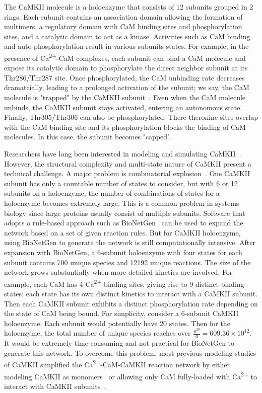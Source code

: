 \documentclass[10pt,letterpaper]{article}
\begin{document}
The CaMKII molecule is a holoenzyme that consists of 12 subunits grouped in 2 rings. Each subunit contains an association domain allowing the formation of multimers, a regulatory domain with CaM binding sites and phosphorylation sites, and a catalytic domain to act as a kinase. Activities such as CaM binding and auto-phosphorylation result in various subunits states. For example, in the presence of Ca\textsuperscript{2+}-CaM complexes, each subunit can bind a CaM molecule and expose its catalytic domain to phosphorylate the direct neighbor subunit at its Thr286/Thr287 site. Once phosphorylated, the CaM unbinding rate decreases dramatcially, leading to a prolonged activation of the subunit; we say, the CaM molecule is "trapped" by the CaMKII subunit~\cite{Meyer:1992dp}. Even when the CaM molecule unbinds, the CaMKII subunit stays activated, entering an autonomous state. Finally, Thr305/Thr306 can also be phosphorylated. There theronine sites overlap with the CaM binding site and its phosphorylation blocks the binding of CaM molecules. In this case, the subunit becomes "capped". 

Researchers have long been interested in modeling and simulating CaMKII~\cite{Zhabotinsky:2000fp,Holmes:2000uk,Kubota:2001ul,Dupont:2003vq,Bhalla:2004cu,Lucic:2008gt,Zeng:2010bq,Pepke:2010ju,Michalski:2012ds}. However, the structural complexity and multi-state nature of CaMKII present a technical challenge. A major problem is combinatorial explosion~\cite{Stefan:2014gl}. One CaMKII subunit has only a countable number of states to consider, but with 6 or 12 subunits on a holoenzyme, the number of combinations of states for a holoenzyme becomes extremely large. This is a common problem in systems biology since large proteins usually consist of multiple subunits. Software that adopts a rule-based approach such as BioNetGen~\cite{Hlavacek:2006iq} can be used to expand the network based on a set of given reaction rules. But for CaMKII holoenzyme, using BioNetGen to generate the network is still computationally intensive. After expansion with BioNetGen, a 6-subunit holoenzyme with four states for each subunit contains 700 unique species and 12192 unique reactions. The size of the network grows substantially when more detailed kinetics are involved. For example, each CaM has 4 Ca\textsuperscript{2+}-binding sites, giving rise to 9 distinct binding states; each state has its own distinct kinetics to interact with a CaMKII subunit. Then each CaMKII subunit exhibits a distinct phosphorylation rate depending on the state of CaM being bound. For simplicity, consider a 6-subunit CaMKII holoenzyme. Each subunit would potentially have 20 states. Then for the holoenzyme, the total number of unique species reaches over $\frac{6^{20}}{6}=609.36\times10^{12}$. It would be extremely time-consuming and not practical for BioNetGen to generate this network. To overcome this problem, most previous modeling studies of CaMKII simplified the Ca\textsuperscript{2+}-CaM-CaMKII reaction network by either modeling CaMKII as monomers~\cite{Bhalla:2004cu,Pepke:2010ju} or allowing only CaM fully-loaded with Ca\textsuperscript{2+} to interact with CaMKII subunits~\cite{Zhabotinsky:2000fp,Kubota:2001ul,Dupont:2003vq,Michalski:2012ds}.
\end{document}
